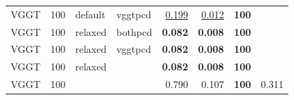 \begin{table}[H]
\begin{tabular}{lrllrrrr}
VGGT & 100 & default & vggtpcd & \underline{0.199} & \underline{0.012} & \textbf{100} &  \\
VGGT & 100 & relaxed & bothpcd & \textbf{0.082} & \textbf{0.008} & \textbf{100} &  \\
VGGT & 100 & relaxed & vggtpcd & \textbf{0.082} & \textbf{0.008} & \textbf{100} &  \\
VGGT & 100 & relaxed &  & \textbf{0.082} & \textbf{0.008} & \textbf{100} &  \\
VGGT & 100 &  &  & 0.790 & 0.107 & \textbf{100} & 0.311 \\
\bottomrule
\end{tabular}
\end{table}
